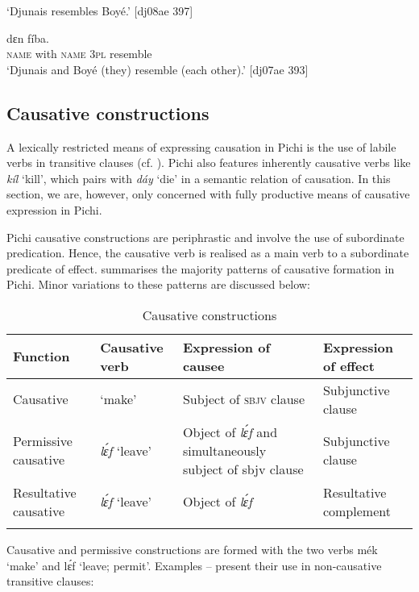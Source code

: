 \glt ‘Djunais resembles Boyé.’ [dj08ae 397]
\z


\ea%
    \label{ex:key:1318}
    \gll {}        dɛn  fíba.\\
\textsc{name}  with    \textsc{name}  \textsc{3pl}  resemble\\

\glt ‘Djunais and Boyé (they) resemble (each other).’ [dj07ae 393]
\z

\subsection{Causative constructions}\label{sec:9.4.4}

A lexically restricted means of expressing causation in Pichi is the use of labile verbs in transitive clauses (cf. ). Pichi also features inherently causative verbs like \textit{kíl} ‘kill’, which pairs with \textit{dáy} ‘die’ in a semantic relation of causation. In this section, we are, however, only concerned with fully productive means of causative expression in Pichi. 


Pichi causative constructions are periphrastic and involve the use of subordinate predication. Hence, the causative verb is realised as a main verb to a subordinate predicate of effect.  summarises the majority patterns of causative formation in Pichi. Minor variations to these patterns are discussed below:


\begin{table}
\caption{Causative constructions}
\label{tab:key:9.12}
\small
\begin{tabularx}{\textwidth}{XlQQ}
\lsptoprule

Function & Causative verb & Expression of causee & Expression of effect \\
\midrule
Causative &  ‘make’ & Subject of \textsc{sbjv} clause & Subjunctive clause \\
\tablevspace
Permissive causative & \textit{lɛ́f} ‘leave’ & Object of \textit{lɛ́f} and simultaneously subject of sbjv clause & Subjunctive clause \\
\tablevspace
Resultative causative & \textit{lɛ́f} ‘leave’ & Object of \textit{lɛ́f} & Resultative complement\\
\lspbottomrule
\end{tabularx}
\end{table}
Causative and permissive constructions are formed with the two verbs mék ‘make’ and lɛ́f ‘leave; permit’. Examples – present their use in non-causative transitive clauses:


